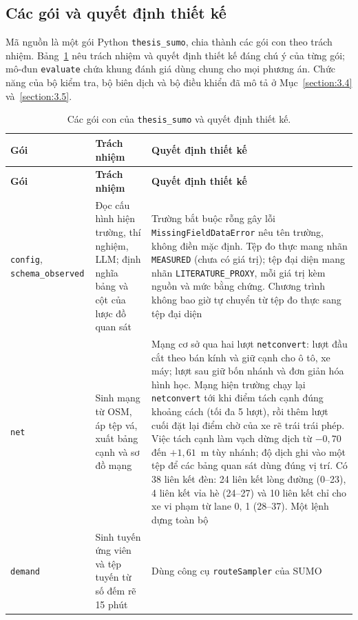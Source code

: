 \documentclass[../DoAn.tex]{subfiles}
\begin{document}
\subsection{Các gói và quyết định thiết kế}
\label{subsection:package_design}

Mã nguồn là một gói Python \texttt{thesis\_sumo}, chia thành các gói con theo trách nhiệm. Bảng~\ref{table:4.1} nêu trách nhiệm và quyết định thiết kế đáng chú ý của từng gói; mô-đun \texttt{evaluate} chứa khung đánh giá dùng chung cho mọi phương án. Chức năng của bộ kiểm tra, bộ biên dịch và bộ điều khiển đã mô tả ở Mục~\ref{section:3.4} và~\ref{section:3.5}.

\begingroup\small
\begin{longtable}{|p{2.3cm}|p{4.2cm}|p{7.5cm}|}
\caption{Các gói con của \texttt{thesis\_sumo} và quyết định thiết kế.}\label{table:4.1}\\
\hline
\textbf{Gói} & \textbf{Trách nhiệm} & \textbf{Quyết định thiết kế} \\ \hline
\endfirsthead
\hline
\textbf{Gói} & \textbf{Trách nhiệm} & \textbf{Quyết định thiết kế} \\ \hline
\endhead
\texttt{config}, \texttt{schema\_\allowbreak observed} & Đọc cấu hình hiện trường, thí nghiệm, LLM; định nghĩa bảng và cột của lược đồ quan sát & Trường bắt buộc rỗng gây lỗi \texttt{MissingFieldDataError} nêu tên trường, không điền mặc định. Tệp đo thực mang nhãn \texttt{MEASURED} (chưa có giá trị); tệp đại diện mang nhãn \texttt{LITERATURE\_PROXY}, mỗi giá trị kèm nguồn và mức bằng chứng. Chương trình không bao giờ tự chuyển từ tệp đo thực sang tệp đại diện \\ \hline
\texttt{net} & Sinh mạng từ OSM, áp tệp vá, xuất bảng cạnh và sơ đồ mạng & Mạng cơ sở qua hai lượt \texttt{netconvert}: lượt đầu cắt theo bán kính và giữ cạnh cho ô tô, xe máy; lượt sau giữ bốn nhánh và đơn giản hóa hình học. Mạng hiện trường chạy lại \texttt{netconvert} tới khi điểm tách cạnh đúng khoảng cách (tối đa 5 lượt), rồi thêm lượt cuối đặt lại điểm chờ của xe rẽ trái trái phép. Việc tách cạnh làm vạch dừng dịch từ $-0{,}70$ đến $+1{,}61$~m tùy nhánh; độ dịch ghi vào một tệp để các bảng quan sát dùng đúng vị trí. Có 38 liên kết đèn: 24 liên kết lòng đường (0--23), 4 liên kết vỉa hè (24--27) và 10 liên kết chỉ cho xe vi phạm từ lane 0, 1 (28--37). Một lệnh dựng toàn bộ \\ \hline
\texttt{demand} & Sinh tuyến ứng viên và tệp tuyến từ số đếm rẽ 15 phút & Dùng công cụ \texttt{routeSampler} của SUMO \\ \hline

\end{longtable}
\end{document}
